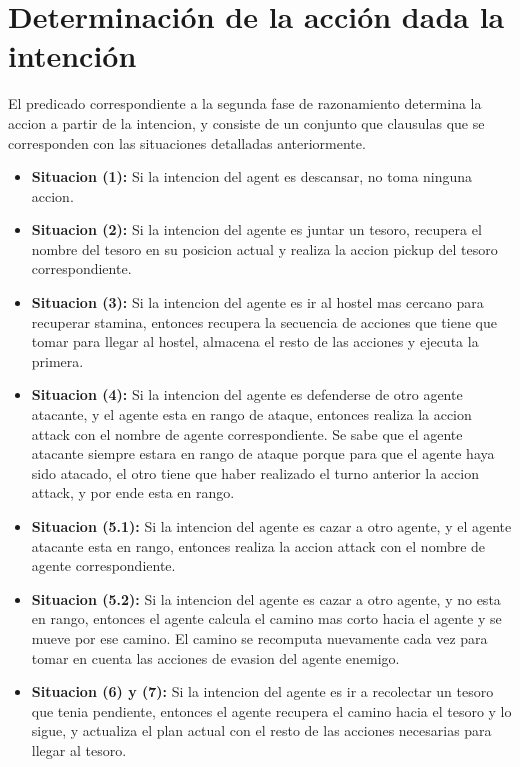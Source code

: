 \documentclass[a4paper,12pt]{report}
\begin{document}
\section{Determinaci\'{o}n de la acci\'{o}n dada la intenci\'{o}n}

El predicado correspondiente a la segunda fase de razonamiento determina la accion a partir de la
intencion, y consiste de un conjunto que clausulas que se corresponden con las situaciones 
detalladas anteriormente.

\begin{itemize}

\item \textbf{Situacion (1):}
Si la intencion del agent es descansar, no toma ninguna accion. 

\item \textbf{Situacion (2):}
Si la intencion del agente es juntar un tesoro, recupera el nombre del tesoro en su posicion 
actual y realiza la accion pickup del tesoro correspondiente.

\item \textbf{Situacion (3):}
Si la intencion del agente es ir al hostel mas cercano para recuperar stamina, entonces recupera
la secuencia de acciones que tiene que tomar para llegar al hostel, almacena el resto de las 
acciones y ejecuta la primera.

\item \textbf{Situacion (4):}
Si la intencion del agente es defenderse de otro agente atacante, y el agente esta en rango de
ataque, entonces realiza la accion attack con el nombre de agente correspondiente.
Se sabe que el agente atacante siempre estara en rango de ataque porque para que el agente haya
sido atacado, el otro tiene que haber realizado el turno anterior la accion attack, y por ende
esta en rango.

\item \textbf{Situacion (5.1):}
Si la intencion del agente es cazar a otro agente, y el agente atacante esta en rango, entonces
realiza la accion attack con el nombre de agente correspondiente.

\item \textbf{Situacion (5.2):}
Si la intencion del agente es cazar a otro agente, y no esta en rango, entonces el agente calcula
el camino mas corto hacia el agente y se mueve por ese camino. 
El camino se recomputa nuevamente cada vez para tomar en cuenta las acciones de evasion del agente
enemigo.

\item \textbf{Situacion (6) y (7):}
Si la intencion del agente es ir a recolectar un tesoro que tenia pendiente, entonces el agente
recupera el camino hacia el tesoro y lo sigue, y actualiza el plan actual con el resto de las 
acciones necesarias para llegar al tesoro. 


\end{itemize}
\end{document}

